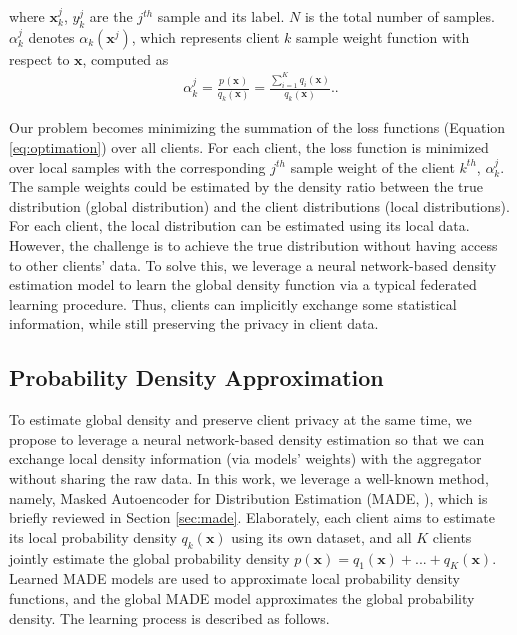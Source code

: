 \documentclass[journal]{IEEEtai}
\newcommand{\px}[2]{p_{#1}(\mathbf{x_{#2}})}
\begin{document}
where $\mathbf{x}_k^j$, $y_k^j$ are the $j^{th}$ sample and its label. $N$ is the total number of samples. $\alpha_k^j$ denotes $\alpha_k(\mathbf{x}^j)$, which represents client $k$ sample weight function with respect to $\mathbf{x}$, computed as
\begin{equation}
\begin{aligned}
	\boxed{\alpha_k^j = \frac{ \px{}{}}{q_k(\mathbf{x})}  = \frac{ \sum_{i=1}^{K}q_i(\mathbf{x}) }{q_k(\mathbf{x})}. }  
	\label{eq:alpha}.
\end{aligned}
\end{equation}

Our problem becomes minimizing the summation of the loss functions (Equation \ref{eq:optimation}) over all clients. For each client, the loss function is minimized over local samples with the corresponding $j^{th}$ sample weight of the client $k^{th}$, $\alpha_k^j$. The sample weights could be estimated by the density ratio between the true distribution (global distribution) and the client distributions (local distributions). For each client, the local distribution can be estimated using its local data. However, the challenge is to achieve the true distribution without having access to other clients' data. To solve this, we leverage a neural network-based density estimation model to learn the global density function via a typical federated learning procedure. Thus, clients can implicitly exchange some statistical information, while still preserving the privacy in client data.          

\subsection{Probability Density Approximation}
\label{sec:densityapproximation}
To estimate global density and preserve client privacy at the same time, we propose to leverage a neural network-based density estimation so that we can exchange local density information (via models' weights) with the aggregator without sharing the raw data. In this work, we leverage a well-known method, namely, Masked Autoencoder for Distribution Estimation (MADE, \cite{MADE}), which is briefly reviewed in Section \ref{sec:made}. Elaborately, each client aims to estimate its local probability density $q_k(\mathbf{x})$ using its own dataset, and all $K$ clients jointly estimate the global probability density $p(\mathbf{x}) = q_1(\mathbf{x})+...+q_K(\mathbf{x})$. Learned MADE models are used to approximate local probability density functions, and the global MADE model approximates the global probability density. The learning process is described as follows.    
\end{document}
